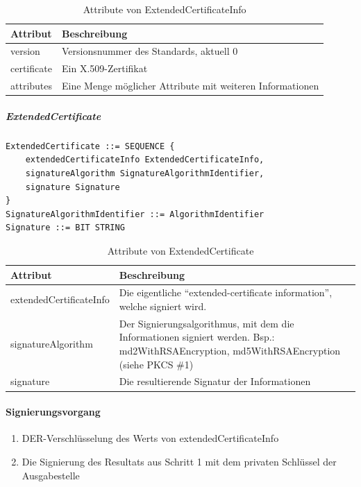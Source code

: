 \documentclass[10pt,a4paper]{article}
\begin{document}
\begin{table}[ht]
    \centering
    \begin{tabular}{|l|p{7.2cm}|} \hline
        \textbf{Attribut} & \textbf{Beschreibung} \\\hline
        version & Versionsnummer des Standards, aktuell 0 \\\hline
        certificate & Ein X.509-Zertifikat \\\hline
        attributes & Eine Menge möglicher Attribute mit weiteren Informationen \\\hline
    \end{tabular}
    \caption{Attribute von ExtendedCertificateInfo}
    \label{tab:ext-cert-info-attribs}
\end{table}


\subparagraph{ExtendedCertificate}
\begin{verbatim}
ExtendedCertificate ::= SEQUENCE {
    extendedCertificateInfo ExtendedCertificateInfo,
    signatureAlgorithm SignatureAlgorithmIdentifier,
    signature Signature
}
SignatureAlgorithmIdentifier ::= AlgorithmIdentifier
Signature ::= BIT STRING
\end{verbatim}

\begin{table}[ht]
    \centering
    \begin{tabular}{|l|p{7.2cm}|} \hline
        \textbf{Attribut} & \textbf{Beschreibung} \\\hline
        extendedCertificateInfo & Die eigentliche "`extended-certificate information"',
            welche signiert wird. \\\hline
        signatureAlgorithm & Der Signierungsalgorithmus, mit dem die Informationen
            signiert werden. Bsp.: md2WithRSAEncryption, md5WithRSAEncryption (siehe PKCS
            \#1) \\\hline
        signature & Die resultierende Signatur der Informationen \\\hline
    \end{tabular}
    \caption{Attribute von ExtendedCertificate}
    \label{tab:ext-cert-attribs}
\end{table}

\paragraph{Signierungsvorgang}
\begin{enumerate}
    \item DER-Verschlüsselung des Werts von extendedCertificateInfo
    \item Die Signierung des Resultats aus Schritt 1 mit dem privaten Schlüssel der
        Ausgabestelle
\end{enumerate}
\end{document}
